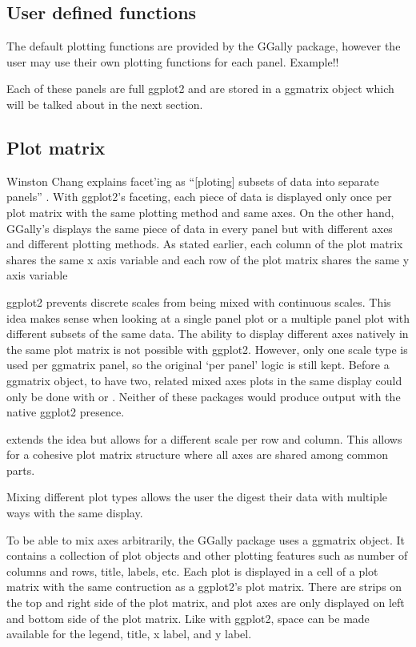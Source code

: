\documentclass[article]{jss}
\begin{document}
\subsection{User defined functions}

The default plotting functions are provided by the GGally package, however the user may use their own plotting functions for each panel.
Example!!


Each of these panels are full ggplot2 and are stored in a ggmatrix object which will be talked about in the next section.


\subsection{Plot matrix}

  Winston Chang explains facet'ing as ``[ploting] subsets of data into separate panels'' \cite{chang2013rgc}.
  With ggplot2's faceting, each piece of data is displayed only once per plot matrix with the same plotting method and same axes.
  On the other hand, GGally's  displays the same piece of data in every panel but with different axes and different plotting methods.
  As stated earlier, each column of the plot matrix shares the same x axis variable and each row of the plot matrix shares the same y axis variable


  ggplot2 prevents discrete scales from being mixed with continuous scales.
  This idea makes sense when looking at a single panel plot or a multiple panel plot with different subsets of the same data.
  The ability to display different axes natively in the same plot matrix is not possible with ggplot2.
  However, only one scale type is used per ggmatrix panel, so the original `per panel' logic is still kept.
  Before a ggmatrix object, to have two, related mixed axes plots in the same display could only be done with  or .
  Neither of these packages would produce output with the native ggplot2 presence.


   extends the  idea but allows for a different scale per row and column.
  This allows for a cohesive plot matrix structure where all axes are shared among common parts.


  Mixing different plot types allows the user the digest their data with multiple ways with the same display.


  To be able to mix axes arbitrarily, the GGally package uses a ggmatrix object.
  It contains a collection of plot objects and other plotting features such as number of columns and rows, title, labels, etc.
  Each plot is displayed in a cell of a plot matrix with the same contruction as a ggplot2's  plot matrix.
  There are strips on the top and right side of the plot matrix, and plot axes are only displayed on left and bottom side of the plot matrix.
  Like with ggplot2, space can be made available for the legend, title, x label, and y label.
\end{document}
